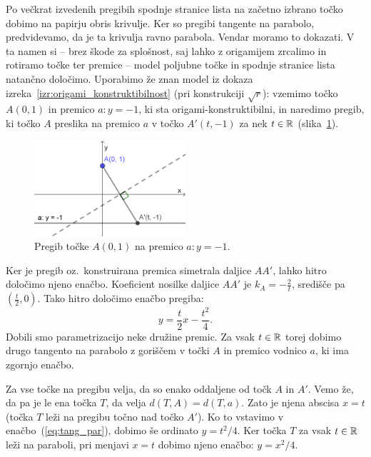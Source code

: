 Po večkrat izvedenih pregibih spodnje stranice lista na začetno izbrano točko dobimo na papirju obris krivulje. Ker so pregibi tangente na parabolo, predvidevamo, da je ta krivulja ravno parabola. Vendar moramo to dokazati. V ta namen si -- brez škode za splošnost, saj lahko z origamijem zrcalimo in rotiramo točke ter premice -- model poljubne točke in  spodnje stranice lista natančno določimo. Uporabimo že znan model iz dokaza izreka~\ref{izr:origami_konstruktibilnost} (pri konstrukciji $\sqrt{r}$): vzemimo točko $A(0, 1)$ in premico $a: y = -1$, ki sta origami-konstruktibilni, in naredimo pregib, ki točko $A$ preslika na premico $a$ v točko $A'(t, -1)$ za nek $t \in \mathbb R$ (slika~\ref{fig:enacba_tangente_par1}).

\begin{figure}[h]
    \centering
    \includegraphics[width=0.5\textwidth]{images/enacba_parabole1.png}
    \caption[Enačba tangente na parabolo]{Pregib točke $A(0, 1)$ na premico $a: y = -1$.}
    \label{fig:enacba_tangente_par1}
\end{figure}

Ker je pregib oz.\ konstruirana premica simetrala daljice $AA'$, lahko hitro določimo njeno enačbo. Koeficient nosilke daljice $AA'$ je $k_A = -\frac{2}{t}$, središče pa $(\frac{t}{2}, 0)$. Tako hitro določimo enačbo pregiba:
\begin{equation}
    y = \frac{t}{2} x - \frac{t^2}{4}.
    \label{eq:tang_par}
\end{equation}
Dobili smo parametrizacijo neke družine premic. Za vsak $t \in \mathbb R$ torej dobimo drugo tangento na parabolo z goriščem v točki $A$ in premico vodnico $a$, ki ima zgornjo enačbo.

Za vse točke na pregibu velja, da so enako oddaljene od točk $A$ in $A'$. Vemo že, da pa je le ena točka $T$, da velja $d(T, A) = d(T, a)$. Zato je njena abscisa $x = t$ (točka $T$ leži na pregibu točno nad točko $A'$). Ko to vstavimo v enačbo~(\ref{eq:tang_par}), dobimo še ordinato $y = t^2/4$. Ker točka $T$ za vsak $t \in \mathbb R$ leži na paraboli, pri menjavi $x = t$ dobimo njeno enačbo: $y = x^2/4$.

